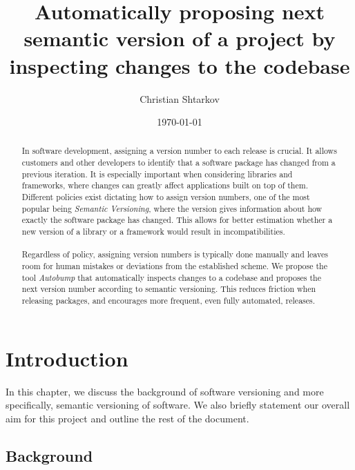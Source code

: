 \documentclass{l4proj}
\begin{document}
\title{Automatically proposing next semantic version of a project by \\
inspecting changes to the codebase}
\author{Christian Shtarkov}
\date{\today}
\maketitle

\begin{abstract}
In software development, assigning a version number
to each release is crucial. It allows customers and other developers
to identify that a software package has changed from a previous
iteration. It is especially important when considering libraries and
frameworks, where changes can greatly affect applications built on top
of them. \\ Different policies exist dictating how to assign version
numbers, one of the most popular being \textit{Semantic
Versioning}\cite{SemanticVersioning}, where the version gives
information about how exactly the software package has changed. This
allows for better estimation whether a new version of a library or a
framework would result in incompatibilities.
\\\\
Regardless of
policy, assigning version numbers is typically done manually and
leaves room for human mistakes or deviations from the established
scheme. We propose the tool \textit{Autobump} that automatically
inspects changes to a codebase and proposes the next version number
according to semantic versioning. This reduces friction when releasing
packages, and encourages more frequent, even fully automated,
releases.
\end{abstract}

\educationalconsent

\tableofcontents

\chapter{Introduction}

In this chapter, we discuss the background of software versioning and
more specifically, semantic versioning of software. We also briefly
statement our overall aim for this project and outline the rest of the
document.

\section{Background}
\end{document}

